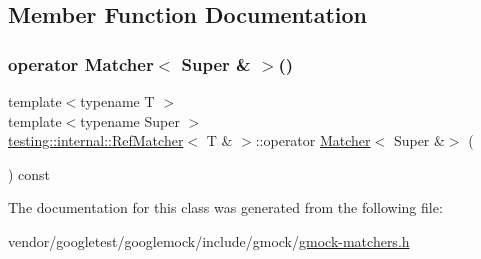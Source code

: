 \subsection{Member Function Documentation}
\mbox{\label{classtesting_1_1internal_1_1_ref_matcher_3_01_t_01_6_01_4_ac146f2d10f0b2e361f903225be15d1a9}} 
\subsubsection{\texorpdfstring{operator Matcher$<$ Super \& $>$()}{operator Matcher< Super \& >()}}
{\footnotesize\ttfamily template$<$typename T $>$ \\
template$<$typename Super $>$ \\
\hyperlink{classtesting_1_1internal_1_1_ref_matcher}{testing\+::internal\+::\+Ref\+Matcher}$<$ T \& $>$\+::operator \hyperlink{classtesting_1_1_matcher}{Matcher}$<$ Super \&$>$ (\begin{DoxyParamCaption}{ }\end{DoxyParamCaption}) const\hspace{0.3cm}{\ttfamily [inline]}}



The documentation for this class was generated from the following file\+:\begin{DoxyCompactItemize}
\item 
vendor/googletest/googlemock/include/gmock/\hyperlink{gmock-matchers_8h}{gmock-\/matchers.\+h}\end{DoxyCompactItemize}
